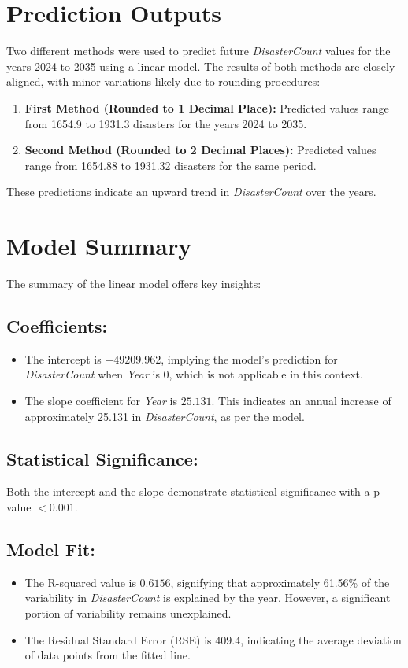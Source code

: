 \documentclass[11pt]{article}\usepackage[]{graphicx}\usepackage[]{xcolor}
\begin{document}
\section*{Prediction Outputs}
Two different methods were used to predict future \textit{DisasterCount} values for the years 2024 to 2035 using a linear model. The results of both methods are closely aligned, with minor variations likely due to rounding procedures:

\begin{enumerate}
    \item \textbf{First Method (Rounded to 1 Decimal Place):} Predicted values range from 1654.9 to 1931.3 disasters for the years 2024 to 2035.
    \item \textbf{Second Method (Rounded to 2 Decimal Places):} Predicted values range from 1654.88 to 1931.32 disasters for the same period.
\end{enumerate}

These predictions indicate an upward trend in \textit{DisasterCount} over the years.

\section*{Model Summary}
The summary of the linear model offers key insights:

\subsection*{Coefficients:}
\begin{itemize}
    \item The intercept is $-49209.962$, implying the model's prediction for \textit{DisasterCount} when \textit{Year} is 0, which is not applicable in this context.
    \item The slope coefficient for \textit{Year} is $25.131$. This indicates an annual increase of approximately 25.131 in \textit{DisasterCount}, as per the model.
\end{itemize}

\subsection*{Statistical Significance:}
Both the intercept and the slope demonstrate statistical significance with a p-value $< 0.001$.

\subsection*{Model Fit:}
\begin{itemize}
    \item The R-squared value is $0.6156$, signifying that approximately 61.56\% of the variability in \textit{DisasterCount} is explained by the year. However, a significant portion of variability remains unexplained.
    \item The Residual Standard Error (RSE) is $409.4$, indicating the average deviation of data points from the fitted line.
\end{itemize}
\end{document}
